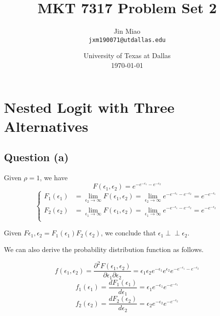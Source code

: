\documentclass{article}
\title{MKT 7317 Problem Set 2} %
\author{Jin Miao\\ \texttt{jxm190071@utdallas.edu}} %
\date{University of Texas at Dallas \\ \today} %
\newcommand{\indep}{\perp \!\!\! \perp}
\begin{document}
\doublespacing
\maketitle %


\section{Nested Logit with Three Alternatives}

\subsection*{Question (a)}
Given $\rho = 1$, we have 
\begin{equation*}
F(\epsilon_1, \epsilon_2) = e^{-e^{-\epsilon_1} - e^{-\epsilon_2}}
\end{equation*}
\begin{equation*}
\begin{cases}
F_1(\epsilon_1) & = \lim_{\epsilon_2 \rightarrow \infty} F(\epsilon_1, \epsilon_2) = \lim_{\epsilon_2 \rightarrow \infty} e^{-e^{-\epsilon_1} - e^{-\epsilon_2}}
= e^{-e^{-\epsilon_1}} \\
F_2(\epsilon_2) & = \lim_{\epsilon_1 \rightarrow \infty} F(\epsilon_1, \epsilon_2) = \lim_{\epsilon_1 \rightarrow \infty} e^{-e^{-\epsilon_1} - e^{-\epsilon_2}}
= e^{-e^{-\epsilon_2}} \\
\end{cases}
\end{equation*}

Given $F{\epsilon_1, \epsilon_2} = F_1(\epsilon_1) F_2(\epsilon_2)$, we conclude that $\epsilon_1 \indep \epsilon_2 $. 

We can also derive the probability distribution function as follows. 

\begin{equation*}
f(\epsilon_1, \epsilon_2) = \frac{\partial^2 F(\epsilon_1, \epsilon_2)}{\partial \epsilon_1 \partial \epsilon_2} = \epsilon_1 \epsilon_2 e^{-\epsilon_1} e^{\epsilon_2} e^{-e^{-\epsilon_1} - e^{-\epsilon_2}}
\end{equation*}
\begin{equation*}
f_1(\epsilon_1) = \frac{d F_1(\epsilon_1)}{d \epsilon_1 } = \epsilon_1 e^{-\epsilon_1} e^{-e^{-\epsilon_1}}
\end{equation*}
\begin{equation*}
f_2(\epsilon_2) = \frac{d F_2(\epsilon_2)}{d \epsilon_2 } = \epsilon_2 e^{-\epsilon_2} e^{-e^{-\epsilon_2}}
\end{equation*}
\end{document}
